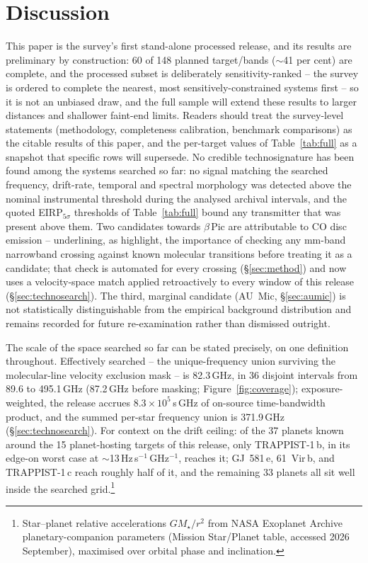 \documentclass{openjournal}
\begin{document}
\section{Discussion}
\label{sec:discussion}
This paper is the survey's first stand-alone processed release, and its
results are preliminary by construction: 60 of 148 planned
target/bands ($\sim$41 per cent) are complete, and the processed
subset is deliberately sensitivity-ranked -- the survey is ordered to
complete the nearest, most sensitively-constrained systems first -- so
it is not an unbiased draw, and the full sample will extend these
results to larger distances and shallower faint-end limits. Readers
should treat the survey-level statements (methodology, completeness
calibration, benchmark comparisons) as the citable results of this
paper, and the per-target values of Table~\ref{tab:full} as a snapshot
that specific rows will supersede. No credible technosignature has
been found among the systems searched so far: no signal matching the
searched frequency, drift-rate, temporal and spectral morphology was
detected above the nominal instrumental threshold during the analysed
archival intervals, and the quoted EIRP$_{5\sigma}$ thresholds of
Table~\ref{tab:full} bound any transmitter that was present above
them. Two candidates towards $\beta$\,Pic are attributable to CO disc
emission -- underlining, as \citet{Mason2024} highlight, the
importance of checking any mm-band narrowband crossing against known
molecular transitions before treating it as a candidate; that check is
automated for every crossing (\S\ref{sec:method}) and now uses a
velocity-space match applied retroactively to every window of this
release (\S\ref{sec:technosearch}). The third, marginal candidate
(AU~Mic, \S\ref{sec:aumic}) is not statistically distinguishable from
the empirical background distribution and remains recorded for future
re-examination rather than dismissed outright.

The scale of the space searched so far can be stated precisely, on one
definition throughout. Effectively searched -- the unique-frequency
union surviving the molecular-line velocity exclusion mask -- is
82.3\,GHz, in 36 disjoint intervals from 89.6 to 495.1\,GHz (87.2\,GHz
before masking; Figure~\ref{fig:coverage}); exposure-weighted, the
release accrues $8.3\times10^{5}$\,s\,GHz of on-source
time-bandwidth product, and the summed per-star frequency union is
371.9\,GHz (\S\ref{sec:technosearch}). For context on the drift
ceiling: of the 37 planets known around the 15 planet-hosting targets
of this release, only TRAPPIST-1\,b, in its edge-on worst case at
$\sim$13\,Hz\,s$^{-1}$\,GHz$^{-1}$, reaches it; GJ~581\,e, 61~Vir\,b,
and TRAPPIST-1\,c reach roughly half of it, and the remaining 33
planets all sit well inside the searched
grid.\footnote{Star--planet relative accelerations $GM_\star/r^{2}$
from NASA Exoplanet Archive planetary-companion parameters (Mission
Star/Planet table, accessed 2026 September), maximised over orbital
phase and inclination.}
\end{document}
